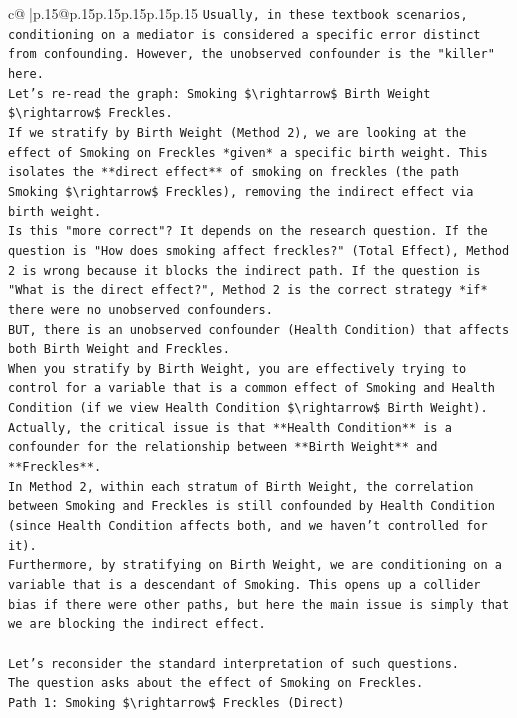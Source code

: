 \documentclass{article}
\begin{document}
{\begin{supertabular}{c@{$\;$}|p{.15\linewidth}@{}p{.15\linewidth}p{.15\linewidth}p{.15\linewidth}p{.15\linewidth}p{.15\linewidth}}
{{{\texttt{Usually, in these textbook scenarios, conditioning on a mediator is considered a specific error distinct from confounding. However, the unobserved confounder is the "killer" here.} \\
\texttt{Let's re{-}read the graph: Smoking \$\textbackslash{}rightarrow\$ Birth Weight \$\textbackslash{}rightarrow\$ Freckles.} \\
\texttt{If we stratify by Birth Weight (Method 2), we are looking at the effect of Smoking on Freckles *given* a specific birth weight. This isolates the **direct effect** of smoking on freckles (the path Smoking \$\textbackslash{}rightarrow\$ Freckles), removing the indirect effect via birth weight.} \\
\texttt{Is this "more correct"? It depends on the research question. If the question is "How does smoking affect freckles?" (Total Effect), Method 2 is wrong because it blocks the indirect path. If the question is "What is the direct effect?", Method 2 is the correct strategy *if* there were no unobserved confounders.} \\
\texttt{BUT, there is an unobserved confounder (Health Condition) that affects both Birth Weight and Freckles.} \\
\texttt{When you stratify by Birth Weight, you are effectively trying to control for a variable that is a common effect of Smoking and Health Condition (if we view Health Condition \$\textbackslash{}rightarrow\$ Birth Weight).} \\
\texttt{Actually, the critical issue is that **Health Condition** is a confounder for the relationship between **Birth Weight** and **Freckles**.} \\
\texttt{In Method 2, within each stratum of Birth Weight, the correlation between Smoking and Freckles is still confounded by Health Condition (since Health Condition affects both, and we haven't controlled for it).} \\
\texttt{Furthermore, by stratifying on Birth Weight, we are conditioning on a variable that is a descendant of Smoking. This opens up a collider bias if there were other paths, but here the main issue is simply that we are blocking the indirect effect.} \\
\\ 
\texttt{Let's reconsider the standard interpretation of such questions.} \\
\texttt{The question asks about the effect of Smoking on Freckles.} \\
\texttt{Path 1: Smoking \$\textbackslash{}rightarrow\$ Freckles (Direct)} \\
}}}
\end{supertabular}}
\end{document}
